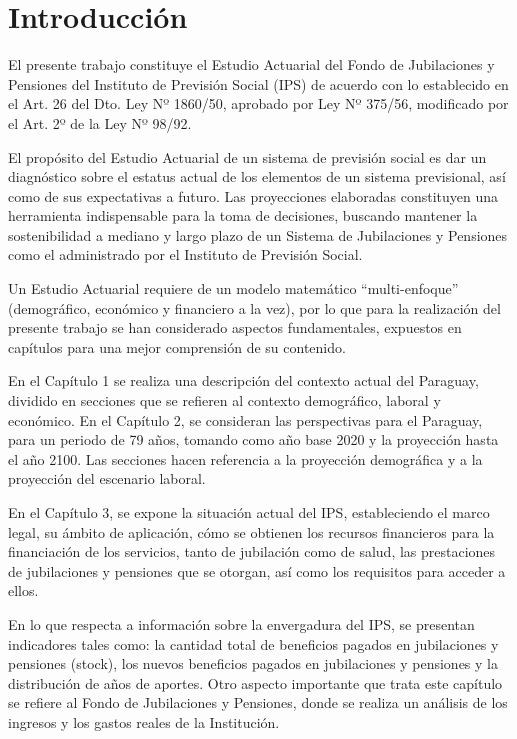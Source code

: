 \documentclass[a4paper,11pt]{article}
\begin{document}
\newpage
\tableofcontents




\newpage
\section{Introducción}

El presente trabajo constituye el Estudio Actuarial del Fondo de Jubilaciones y Pensiones del Instituto de Previsión Social (IPS) de acuerdo con lo establecido en el Art. 26 del Dto. Ley Nº 1860/50, aprobado por Ley Nº 375/56, modificado por el Art. 2º de la Ley Nº 98/92.

El propósito del Estudio Actuarial de un sistema de previsión social es dar un diagnóstico sobre el estatus actual de los elementos de un sistema previsional, así como de sus expectativas a futuro. Las proyecciones elaboradas constituyen una herramienta indispensable para la toma de decisiones, buscando mantener la sostenibilidad a mediano y largo plazo de un Sistema de Jubilaciones y Pensiones como el administrado por el Instituto de Previsión Social.

Un Estudio Actuarial requiere de un modelo matemático “multi-enfoque” (demográfico, económico y financiero a la vez), por lo que para la realización del presente trabajo se han considerado aspectos fundamentales, expuestos en capítulos para una mejor comprensión de su contenido. 

En el Capítulo 1 se realiza una descripción del contexto actual del Paraguay, dividido en secciones que se refieren al contexto demográfico, laboral y económico. En el Capítulo 2, se consideran las perspectivas para el Paraguay, para un periodo de 79 años, tomando como año base 2020 y la proyección hasta el año 2100.  Las secciones hacen referencia a la proyección demográfica y a la proyección del escenario laboral.

En el Capítulo 3, se expone la situación actual del IPS, estableciendo el marco legal, su ámbito de aplicación, cómo se obtienen los recursos financieros para la financiación de los servicios, tanto de jubilación como de salud, las prestaciones de jubilaciones y pensiones que se otorgan, así como los requisitos para acceder a ellos.

En lo que respecta a información sobre la envergadura del IPS, se presentan indicadores tales como: la cantidad total de beneficios pagados en jubilaciones y pensiones (stock), los nuevos beneficios pagados en jubilaciones y pensiones y la distribución de años de aportes. Otro aspecto importante que trata este capítulo se refiere al Fondo de Jubilaciones y Pensiones, donde se realiza un análisis de los ingresos y los gastos reales de la Institución.
\end{document}
